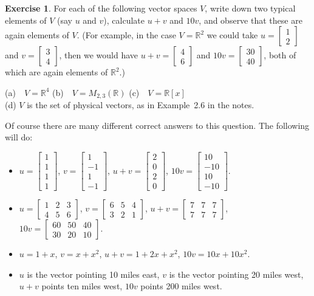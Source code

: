 \documentclass{amsart}
\newcommand{\R}         {{\mathbb{R}}}
\newcommand{\bsm}       {\left[\begin{smallmatrix}}
\newcommand{\esm}       {\end{smallmatrix}\right]}
\renewcommand{\:}       {\colon}
\theoremstyle{definition}
\newtheorem{exercise}{Exercise}[section]
\renewenvironment{solution}{\SolutionAtEnd}{\endSolutionAtEnd}
\begin{document}
\begin{exercise}
 For each of the following vector spaces $V$, write down two
 typical elements of $V$ (say $u$ and $v$), calculate $u+v$
 and $10v$, and observe that these are again elements of
 $V$.  (For example, in the case $V=\R^2$ we could take
 $u=\bsm 1\\2\esm$ and $v=\bsm 3\\4\esm$, then we would have
 $u+v=\bsm 4\\6\esm$ and $10v=\bsm 30\\40\esm$, both of
 which are again elements of $\R^2$.)
 \begin{center}
  (a)~~$V=\R^4$  \hspace{3em}
  (b)~~$V=M_{2,3}(\R)$ \hspace{3em}
  (c)~~$V=\R[x]$ \\
  (d) $V$ is the set of physical vectors, as in
   Example~2.6 in the notes.
 \end{center}
\end{exercise}
\begin{solution}
 Of course there are many different correct answers to this
 question. The following will do:
 \begin{itemize}
  \item[(a)] $u=\bsm 1\\1\\1\\1\esm$,
             $v=\bsm 1\\-1\\1\\-1\esm$,
             $u+v=\bsm 2\\0\\2\\0\esm$,
             $10v=\bsm 10\\-10\\10\\-10\esm$.
  \item[(b)] $u=\bsm 1&2&3\\4&5&6\esm$,
             $v=\bsm 6&5&4\\3&2&1\esm$,
             $u+v=\bsm 7&7&7\\7&7&7\esm$,
             $10v=\bsm 60&50&40\\30&20&10\esm$.
  \item[(c)] $u=1+x$, $v=x+x^2$, $u+v=1+2x+x^2$, $10v=10x+10x^2$. 
  \item[(d)] $u$ is the vector pointing 10 miles east, $v$
   is the vector pointing 20 miles west, $u+v$ points ten
   miles west, $10v$ points 200 miles west.
 \end{itemize}
\end{solution}
\end{document}
